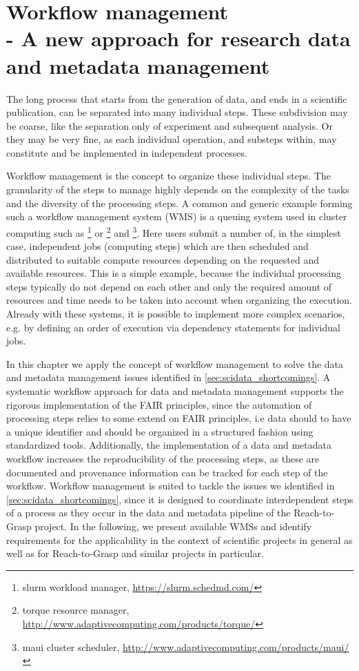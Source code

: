 \cleardoublepage
\chapter[Workflow management]{Workflow management\\- A new approach for research data and metadata management}
\label{sec:workflows}
The long process that starts from the generation of data, and ends in a scientific publication, can be separated into many individual steps. These subdivision may be coarse, like the separation only of experiment and subsequent analysis. Or they may be very fine, as each individual operation, and substeps within, may constitute and be implemented in independent processes.

Workflow management is the concept to organize these individual steps. The granularity of the steps to manage highly depends on the complexity of the tasks and the diversity of the processing steps. A common and generic example forming such a workflow management system (WMS) is a queuing system used in cluster computing such as \footnote{slurm workload manager, \url{https://slurm.schedmd.com/}} or  \footnote{torque resource manager, \url{http://www.adaptivecomputing.com/products/torque/}} and \footnote{maui cluster scheduler, \url{http://www.adaptivecomputing.com/products/maui/}}. Here users submit a number of, in the simplest case, independent jobs (computing steps) which are then scheduled and distributed to suitable compute resources depending on the requested and available resources. This is a simple example, because the individual processing steps typically do not depend on each other and only the required amount of resources and time needs to be taken into account when organizing the execution. Already with these systems, it is possible to implement more complex scenarios, e.g. by defining an order of execution via dependency statements for individual jobs.

In this chapter we apply the concept of workflow management to solve the data and metadata management issues identified in \cref{sec:scidata_shortcomings}. A systematic workflow approach for data and metadata management supports the rigorous implementation of the FAIR principles, since the automation of processing steps relies to some extend on FAIR principles, i.e data should to have a unique identifier and should be organized in a structured fashion using standardized tools. Additionally, the implementation of a data and metadata workflow increases the reproducibility of the processing steps, as these are documented and provenance information can be tracked for each step of the workflow. Workflow management is suited to tackle the issues we identified in \cref{sec:scidata_shortcomings}, since it is designed to coordinate interdependent steps of a process as they occur in the data and metadata pipeline of the Reach-to-Grasp project. In the following, we present available WMSs and identify requirements for the applicability in the context of scientific projects in general as well as for Reach-to-Grasp and similar projects in particular.

